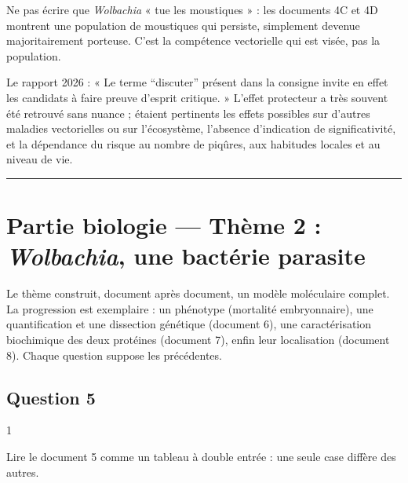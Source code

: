 \documentclass[11pt,a4paper]{article}
\begin{document}
\begin{piege}

Ne pas écrire que \emph{Wolbachia} « tue les moustiques » : les documents 4C et 4D montrent une population de moustiques qui persiste, simplement devenue majoritairement porteuse. C'est la compétence vectorielle qui est visée, pas la population.

\end{piege}

\begin{jury}

Le rapport 2026 : « Le terme ``discuter'' présent dans la consigne invite en effet les candidats à faire preuve d'esprit critique. » L'effet protecteur a très souvent été retrouvé sans nuance ; étaient pertinents les effets possibles sur d'autres maladies vectorielles ou sur l'écosystème, l'absence d'indication de significativité, et la dépendance du risque au nombre de piqûres, aux habitudes locales et au niveau de vie.

\end{jury}

\begin{center}\rule{0.5\linewidth}{0.5pt}\end{center}

\hypertarget{partie-biologie-thuxe8me-2-wolbachia-une-bactuxe9rie-parasite}{%
\section{\texorpdfstring{Partie biologie --- Thème 2 : \emph{Wolbachia}, une bactérie parasite}{Partie biologie --- Thème 2 : Wolbachia, une bactérie parasite}}\label{partie-biologie-thuxe8me-2-wolbachia-une-bactuxe9rie-parasite}}

Le thème construit, document après document, un modèle moléculaire complet. La progression est exemplaire : un phénotype (mortalité embryonnaire), une quantification et une dissection génétique (document 6), une caractérisation biochimique des deux protéines (document 7), enfin leur localisation (document 8). Chaque question suppose les précédentes.

\hypertarget{question-5}{%
\subsection{Question 5}\label{question-5}}

\begin{indication}{1}

Lire le document 5 comme un tableau à double entrée : une seule case diffère des autres.

\end{indication}
\end{document}
